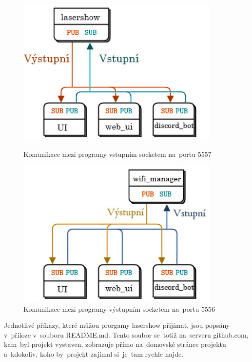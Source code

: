 \begin{figure}[htb]
  \centering
  \begin{minipage}{0.45\textwidth}
    \centering
    \includegraphics[width=0.9\textwidth]{img/comms_lasershow_scheme.jpg}
    \caption{\label{fig:lasershow_comms} Komunikace mezi programy vstupním socketem na~portu 5557}
  \end{minipage}\hfill
  \begin{minipage}{0.45\textwidth}
    \centering
    \includegraphics[width=0.9\textwidth]{img/comms_wifiman_scheme.jpg}
    \caption{\label{fig:wifiman_comms} Komunikace mezi programy výstupním socketem na~portu 5556}
  \end{minipage}
\end{figure}

Jednotlivé příkazy, které můžou prorgamy lasershow přijímat, jsou popsány v~příloze v~souboru README.md. Tento soubor se~totiž na~serveru github.com, kam~byl projekt vystaven, zobrazuje přímo na~domovské stránce projektu a~kdokoliv, koho by~projekt zajímal si~je~tam rychle najde.
